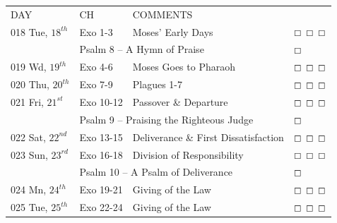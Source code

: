 \documentclass[10pt,landscape,twocolumn,letterpaper]{article}
\begin{document}
\begin{tabular}{p{0.7in}p{0.7in}p{1.8in}p{0.55in}}
  DAY & CH & COMMENTS &  \\
\tiny 018 \normalsize \textcolor[rgb]{0.00,0.00,1.00}{Tue, $18^{th}$} & \textcolor[rgb]{0.00,0.00,1.00}{Exo 1-3} & \textcolor[rgb]{0.50,0.50,0.50}{\footnotesize Moses' Early Days} & $\boxempty$ $\boxempty$ $\boxempty$\\
     &  \multicolumn{2}{l}{\textcolor[rgb]{1.00,0.00,0.00}{Psalm 8 -- A Hymn of Praise}} & $\boxempty$ \\
\tiny 019 \normalsize \textcolor[rgb]{0.00,0.00,1.00}{Wd, $19^{th}$} & \textcolor[rgb]{0.00,0.00,1.00}{Exo 4-6} & \textcolor[rgb]{0.50,0.50,0.50}{\footnotesize Moses Goes to Pharaoh} & $\boxempty$ $\boxempty$ $\boxempty$\\
\tiny 020 \normalsize \textcolor[rgb]{0.00,0.00,1.00}{Thu, $20^{th}$} & \textcolor[rgb]{0.00,0.00,1.00}{Exo 7-9} & \textcolor[rgb]{0.50,0.50,0.50}{\footnotesize Plagues 1-7} & $\boxempty$ $\boxempty$ $\boxempty$\\
\tiny 021 \normalsize \textcolor[rgb]{0.00,0.00,1.00}{Fri, $21^{st}$} & \textcolor[rgb]{0.00,0.00,1.00}{Exo 10-12} & \textcolor[rgb]{0.50,0.50,0.50}{\footnotesize Passover \& Departure} & $\boxempty$ $\boxempty$ $\boxempty$\\
     & \multicolumn{2}{l}{\textcolor[rgb]{1.00,0.00,0.00}{Psalm 9 -- Praising the Righteous Judge}} & $\boxempty$ \\
\tiny 022 \normalsize   \textcolor[rgb]{0.00,0.00,1.00}{Sat, $22^{nd}$} & \textcolor[rgb]{0.00,0.00,1.00}{Exo 13-15} & \textcolor[rgb]{0.50,0.50,0.50}{\footnotesize Deliverance \& First Dissatisfaction} & $\boxempty$ $\boxempty$ $\boxempty$\\
\tiny 023 \normalsize \textcolor[rgb]{0.00,0.00,1.00}{Sun, $23^{rd}$} & \textcolor[rgb]{0.00,0.00,1.00}{Exo 16-18} & \textcolor[rgb]{0.50,0.50,0.50}{\footnotesize Division of Responsibility} & $\boxempty$ $\boxempty$ $\boxempty$\\
     & \multicolumn{2}{l}{\textcolor[rgb]{1.00,0.00,0.00}{Psalm 10 -- A Psalm of Deliverance}} & $\boxempty$ \\
\tiny 024 \normalsize \textcolor[rgb]{0.00,0.00,1.00}{Mn, $24^{th}$} & \textcolor[rgb]{0.00,0.00,1.00}{Exo 19-21} & \textcolor[rgb]{0.50,0.50,0.50}{\footnotesize Giving of the Law} & $\boxempty$ $\boxempty$ $\boxempty$\\
\tiny 025 \normalsize \textcolor[rgb]{0.00,0.00,1.00}{Tue, $25^{th}$} & \textcolor[rgb]{0.00,0.00,1.00}{Exo 22-24} & \textcolor[rgb]{0.50,0.50,0.50}{\footnotesize Giving of the Law} & $\boxempty$ $\boxempty$ $\boxempty$\\

\end{tabular}
\end{document}
